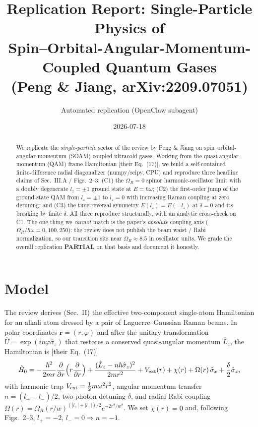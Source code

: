 \documentclass[11pt]{article}
\title{Replication Report: Single-Particle Physics of\\
Spin--Orbital-Angular-Momentum-Coupled Quantum Gases\\
{\large (Peng \& Jiang, arXiv:2209.07051)}}
\author{Automated replication (OpenClaw subagent)}
\date{2026-07-18}
\begin{document}
\maketitle

\begin{abstract}
We replicate the \emph{single-particle} sector of the review by Peng \& Jiang on
spin--orbital-angular-momentum (SOAM) coupled ultracold gases. Working from the
quasi-angular-momentum (QAM) frame Hamiltonian [their Eq.~(17)], we build a
self-contained finite-difference radial diagonalizer (numpy/scipy, CPU) and
reproduce three headline claims of Sec.~III.A / Figs.~2--3: (C1) the
$\Omega_R{=}0$ spinor harmonic-oscillator limit with a doubly degenerate
$l_z{=}\pm1$ ground state at $E{=}\hbar\omega$; (C2) the first-order jump of the
ground-state QAM from $l_z{=}\pm1$ to $l_z{=}0$ with increasing Raman coupling at
zero detuning; and (C3) the time-reversal symmetry $E(l_z){=}E(-l_z)$ at
$\delta{=}0$ and its breaking by finite $\delta$. All three reproduce
structurally, with an analytic cross-check on C1. The one thing we \emph{cannot}
match is the paper's \emph{absolute} coupling axis ($\Omega_R/\hbar\omega{=}0,100,250$):
the review does not publish the beam waist / Rabi normalization, so our transition
sits near $\Omega_R\approx 8.5$ in oscillator units. We grade the overall
replication \textbf{PARTIAL} on that basis and document it honestly.
\end{abstract}

\section{Model}
The review derives (Sec.~II) the effective two-component single-atom Hamiltonian
for an alkali atom dressed by a pair of Laguerre--Gaussian Raman beams. In polar
coordinates $\mathbf r=(r,\varphi)$ and after the unitary transformation
$\hat U=\exp(in\varphi\hat\sigma_z)$ that restores a conserved quasi-angular
momentum $\hat L_z$, the Hamiltonian is [their Eq.~(17)]
\begin{equation}
\hat H_0 = -\frac{\hbar^2}{2mr}\frac{\partial}{\partial r}
   \Big(r\frac{\partial}{\partial r}\Big)
   + \frac{(\hat L_z - n\hbar\hat\sigma_z)^2}{2mr^2}
   + V_{\rm ext}(r) + \chi(r)
   + \Omega(r)\,\hat\sigma_x + \frac{\delta}{2}\hat\sigma_z ,
\end{equation}
with harmonic trap $V_{\rm ext}=\tfrac12 m\omega^2 r^2$, angular momentum transfer
$n=(l_+-l_-)/2$, two-photon detuning $\delta$, and radial Rabi coupling
$\Omega(r)=\Omega_R (r/w)^{(|l_+|+|l_-|)/2}e^{-2r^2/w^2}$. We set $\chi(r)=0$ and,
following Figs.~2--3, $l_+=-2$, $l_-=0\Rightarrow n=-1$.
\end{document}
